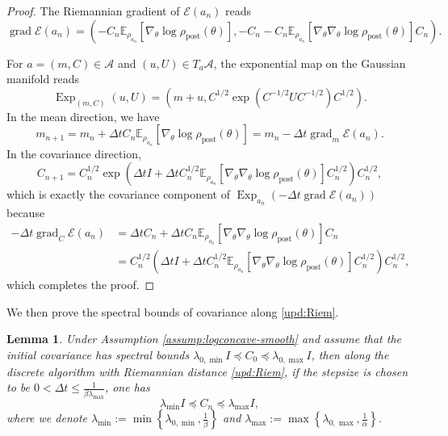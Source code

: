 \documentclass[11pt]{article}
\theoremstyle{plain}
\newtheorem{lemma}[theorem]{Lemma}
\theoremstyle{definition}
\theoremstyle{remark}
\newcommand{\E}{\mathbb{E}}
\newcommand{\post}{\mathrm{post}}
\newcommand{\grad}{\operatorname{grad}}
\newcommand{\Exp}{\operatorname{Exp}}
\newcommand{\Aspace}{\mathcal{A}}
\begin{document}
\begin{proof}
    The Riemannian gradient of $\mathcal{E} (a_n)$ reads
    \begin{equation*}
        \grad \mathcal{E} (a_n) = (- C_n \E_{\rho_{a_n}} [\nabla_\theta \log \rho_\post (\theta)], -C_n - C_n \E_{\rho_{a_n}} [\nabla_\theta \nabla_\theta \log \rho_\post (\theta)] C_n).
    \end{equation*}

    For $a = (m, C) \in \Aspace$ and $(u, U) \in T_a \Aspace$, the exponential map on the Gaussian manifold reads
    \begin{equation*}
        \Exp_{(m, C)} (u, U) = \left( m + u, C^{1/2} \exp (C^{-1/2} U C^{-1/2}) C^{1/2} \right).
    \end{equation*}
    In the mean direction, we have
    \begin{equation*}
        m_{n+1} = m_n + \Delta t C_n \E_{\rho_{a_n}} [\nabla_\theta\log\rho_{\post}(\theta)] = m_n - \Delta t \grad_m \mathcal{E} (a_n).
    \end{equation*}
    In the covariance direction, 
    \begin{equation*}
        C_{n+1} = C_n^{1/2} \exp (\Delta t I + \Delta t C_n^{1/2} \E_{\rho_{a_n}} [\nabla_\theta \nabla_\theta \log \rho_\post (\theta)] C_n^{1/2}) C_n^{1/2},
    \end{equation*}
    which is exactly the covariance component of $\Exp_{a_n} (-\Delta t \grad \mathcal{E} (a_n))$ because
    \begin{align*}
        -\Delta t \grad_C \mathcal{E}(a_n) &= \Delta t C_n + \Delta t C_n \E_{\rho_{a_n}} [\nabla_\theta \nabla_\theta \log \rho_\post (\theta)] C_n \\
        &= C_n^{1/2} (\Delta t I + \Delta t C_n^{1/2} \E_{\rho_{a_n}} [\nabla_\theta \nabla_\theta \log \rho_\post (\theta)] C_n^{1/2}) C_n^{1/2},
    \end{align*}
    which completes the proof.
\end{proof}

We then prove the spectral bounds of covariance along \eqref{upd:Riem}.

\begin{lemma}\label{lem:cov-bound-Riem}
    Under Assumption \ref{assump:logconcave-smooth} and assume that the initial covariance has spectral bounds $\lambda_{0, \min} I \preceq C_0 \preceq \lambda_{0, \max} I$, then along the discrete algorithm with Riemannian distance \eqref{upd:Riem}, if the stepsize is chosen to be $0 < \Delta t \leq \frac{1}{\beta \lambda_{\max}}$, one has
    \begin{equation*}
        \lambda_{\min} I \preceq C_n \preceq \lambda_{\max} I,
    \end{equation*}
    where we denote $\lambda_{\min} := \min \left\{ \lambda_{0, \min}, \frac{1}{\beta} \right\}$ and $\lambda_{\max} := \max \left\{ \lambda_{0, \max}, \frac{1}{\alpha} \right\}$.
\end{lemma}
\end{document}
